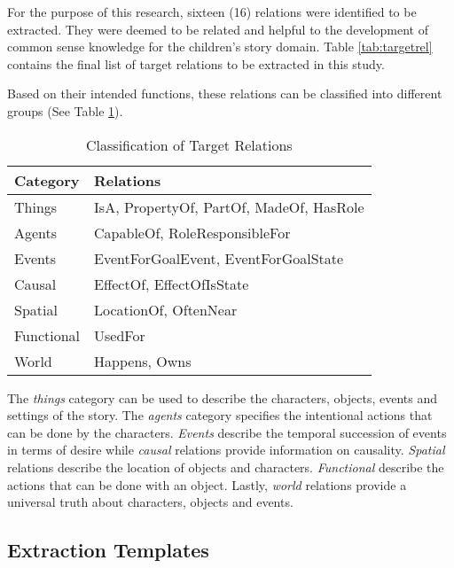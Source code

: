 For the purpose of this research, sixteen (16) relations were identified to be extracted. They were deemed to be related and helpful to the development of common sense knowledge for the children's story domain. Table \ref{tab:targetrel} contains the final list of target relations to be extracted in this study.

Based on their intended functions, these relations can be classified into different groups (See Table \ref{tab:classification}). 

\begin{table}[H]   %
\centering
\caption{Classification of Target Relations} \vspace{0.25em}
\begin{tabular}{|p{4cm}|p{6.5cm}|} \hline
Category & Relations \\ \hline
Things		& IsA, PropertyOf, PartOf, MadeOf, HasRole \\ \hline
Agents		& CapableOf, RoleResponsibleFor \\ \hline
Events		& EventForGoalEvent, EventForGoalState \\ \hline
Causal		& EffectOf, EffectOfIsState \\ \hline
Spatial		& LocationOf, OftenNear \\ \hline
Functional	& UsedFor \\ \hline
World		& Happens, Owns \\ \hline
\end{tabular}
\label{tab:classification}
\end{table}

The \textit{things} category can be used to describe the characters, objects, events and settings of the story. The \textit{agents} category specifies the intentional actions that can be done by the characters. \textit{Events} describe the temporal succession of events in terms of desire while \textit{causal} relations provide information on causality. \textit{Spatial} relations describe the location of objects and characters. \textit{Functional} describe the actions that can be done with an object. Lastly, \textit{world} relations provide a universal truth about characters, objects and events.

\subsection{Extraction Templates}
\label{sec:extractiontemplates}

